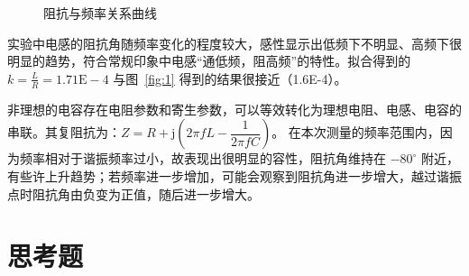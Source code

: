 \documentclass[a4paper,utf8]{article}
\begin{document}
        \begin{figure}[!ht]
            \\
            \\
            \caption{阻抗与频率关系曲线}
        \end{figure}\par
        实验中电感的阻抗角随频率变化的程度较大，感性显示出低频下不明显、高频下很明显的趋势，符合常规印象中电感“通低频，阻高频”的特性。拟合得到的 $k=\frac{L}{R}=1.71\text{E}-4$ 与图~\ref{fig:1} 得到的结果很接近（1.6E-4）。\par
        非理想的电容存在电阻参数和寄生参数，可以等效转化为理想电阻、电感、电容的串联。其复阻抗为：$Z=R+\mathrm{j}(2\pi f L-\dfrac{1}{2\pi f C})$。 在本次测量的频率范围内，因为频率相对于谐振频率过小，故表现出很明显的容性，阻抗角维持在 $-80^\circ$ 附近，有些许上升趋势；若频率进一步增加，可能会观察到阻抗角进一步增大，越过谐振点时阻抗角由负变为正值，随后进一步增大。
\section{思考题}
\end{document}
